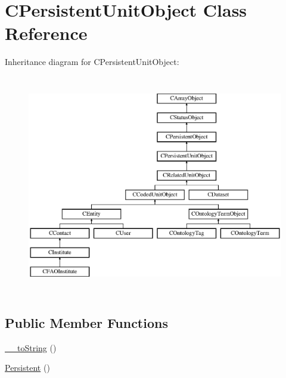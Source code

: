\hypertarget{class_c_persistent_unit_object}{\section{C\-Persistent\-Unit\-Object Class Reference}
\label{class_c_persistent_unit_object}
}
Inheritance diagram for C\-Persistent\-Unit\-Object\-:\begin{figure}[H]
\begin{center}
\leavevmode
\includegraphics[height=9.655172cm]{class_c_persistent_unit_object}
\end{center}
\end{figure}
\subsection*{Public Member Functions}
\begin{DoxyCompactItemize}
\item 
\hyperlink{class_c_persistent_unit_object_af75b0a5542f5d14a9a2879e5d3864cac}{\-\_\-\-\_\-to\-String} ()
\item 
\hyperlink{class_c_persistent_unit_object_a953695de3bbfc5c3d76d0b9b3a39f6a1}{Persistent} ()
\end{DoxyCompactItemize}
